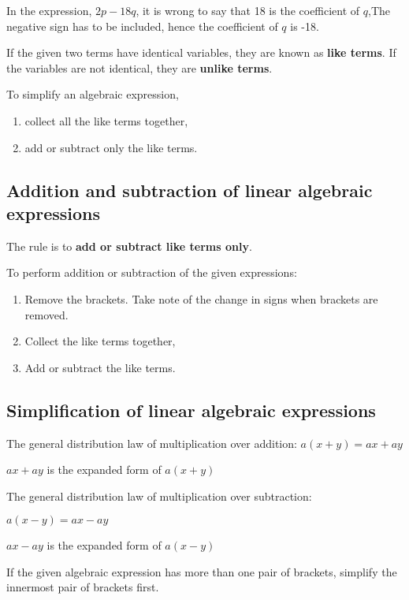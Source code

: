 \documentclass[../main]{subfiles}
\begin{document}
In the expression, \(2p - 18q\), it is wrong to say that 18 is the coefficient
of \(q\),The negative sign has to be included, hence the coefficient of \(q\) is
-18.

If the given two terms have identical variables, they are known as \textbf{like
  terms}. If the variables are not identical, they are  \textbf{unlike terms}.

To simplify an algebraic expression,
\begin{enumerate}
\item  collect all the like terms together,
 
\item  add or subtract only the like terms. 
\end{enumerate}

\subsection{Addition and subtraction of linear algebraic expressions}
The rule is to \textbf{add or subtract like terms only}.

To perform addition or subtraction of the given expressions:

\begin{enumerate}
\item Remove the brackets. Take note of the change in signs when brackets are
  removed.
 
\item  Collect the like terms together,
 
\item Add or subtract the like terms.
\end{enumerate}

\subsection{Simplification of linear algebraic expressions}
The general distribution law of multiplication over addition:
\(a(x + y)= ax + ay\)

\(ax + ay \) is the expanded form of \(a(x + y)\)

The general distribution law of multiplication over subtraction:

\(a(x - y)= ax - ay\)

\(ax - ay \) is the expanded form of \(a(x - y)\)

If the given algebraic expression has  more than one  pair of brackets, simplify
the innermost pair of brackets first.
\end{document}
